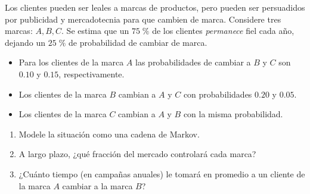 \documentclass[11pt,spanish]{article}
\begin{document}
\begin{exercise}\label{ej:marcas}
Los clientes pueden ser leales a marcas de productos, pero pueden ser
persuadidos por publicidad y mercadotecnia para que cambien de marca.
Considere tres marcas: \(A,B,C\).
Se estima que un \(75\;\%\) de los clientes \emph{permanece} fiel cada año,
dejando un \(25\;\%\) de probabilidad de cambiar de marca.

\medskip
\begin{itemize}
  \item Para los clientes de la marca \(A\) las probabilidades de cambiar a
        \(B\) y \(C\) son \(0.10\) y \(0.15\), respectivamente.
  \item Los clientes de la marca \(B\) cambian a \(A\) y \(C\)
        con probabilidades \(0.20\) y \(0.05\).
  \item Los clientes de la marca \(C\) cambian a \(A\) y \(B\) con la misma
        probabilidad.
\end{itemize}

\begin{enumerate}[label=\alph*)]
\item Modele la situación como una cadena de Markov.
\item A largo plazo, ¿qué fracción del mercado controlará cada marca?
\item ¿Cuánto tiempo (en campañas anuales) le tomará en promedio
      a un cliente de la marca \(A\) cambiar a la marca \(B\)?
\end{enumerate}
\end{exercise}
\end{document}

